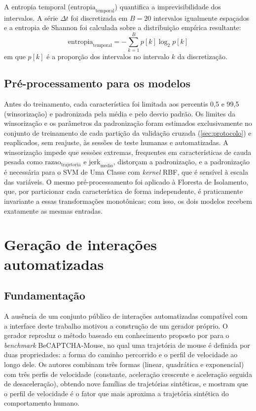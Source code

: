 A entropia temporal ($\text{entropia}_{\text{temporal}}$) quantifica a imprevisibilidade dos intervalos. A série $\Delta t$ foi discretizada em $B = 20$ intervalos igualmente espaçados e a entropia de Shannon foi calculada sobre a distribuição empírica resultante:
\begin{equation}
    \text{entropia}_{\text{temporal}} = -\sum_{k=1}^{B} p[k] \log_2 p[k]
    \label{eq:entropia_temporal}
\end{equation}
em que $p[k]$ é a proporção dos intervalos no intervalo $k$ da discretização.

\subsection{Pré-processamento para os modelos}

Antes do treinamento, cada característica foi limitada aos percentis 0,5 e 99,5 (winsorização) e padronizada pela média e pelo desvio padrão. Os limites da winsorização e os parâmetros da padronização foram estimados exclusivamente no conjunto de treinamento de cada partição da validação cruzada (\autoref{sec:protocolo}) e reaplicados, sem reajuste, às sessões de teste humanas e automatizadas. A winsorização impede que sessões extremas, frequentes em características de cauda pesada como $\text{razao}_{\text{trajetoria}}$ e $\text{jerk}_{\text{medio}}$, distorçam a padronização, e a padronização é necessária para o SVM de Uma Classe com \textit{kernel} RBF, que é sensível à escala das variáveis. O mesmo pré-processamento foi aplicado à Floresta de Isolamento, que, por particionar cada característica de forma independente, é praticamente invariante a essas transformações monotônicas; com isso, os dois modelos recebem exatamente as mesmas entradas.

\section{Geração de interações automatizadas}
\label{sec:bots}

\subsection{Fundamentação}

A ausência de um conjunto público de interações automatizadas compatível com a interface deste trabalho motivou a construção de um gerador próprio. O gerador reproduz o método baseado em conhecimento proposto por  para o \textit{benchmark} BeCAPTCHA-Mouse, no qual uma trajetória de mouse é definida por duas propriedades: a forma do caminho percorrido e o perfil de velocidade ao longo dele. Os autores combinam três formas (linear, quadrática e exponencial) com três perfis de velocidade (constante, aceleração crescente e aceleração seguida de desaceleração), obtendo nove famílias de trajetórias sintéticas, e mostram que o perfil de velocidade é o fator que mais aproxima a trajetória sintética do comportamento humano.

